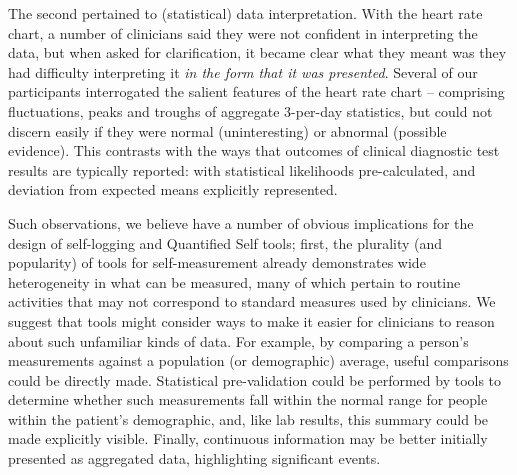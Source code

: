 \documentclass{sigchi}
\begin{document}
The second pertained to (statistical) data interpretation. With the heart rate chart, a number of clinicians said they were not confident in interpreting the data, but when asked for clarification, it became clear what they meant was they had difficulty interpreting it \emph{in the form that it was presented}.  Several of our participants interrogated the salient features of the heart rate chart -- comprising fluctuations, peaks and troughs of aggregate 3-per-day statistics, but could not discern easily if they were normal (uninteresting) or abnormal (possible evidence). This contrasts with the ways that outcomes of clinical diagnostic test results are  typically reported: with statistical likelihoods pre-calculated, and deviation from expected means explicitly represented.

Such observations, we believe have a number of obvious implications for the design of self-logging and Quantified Self tools; first, the plurality (and popularity) of tools for self-measurement already demonstrates wide heterogeneity in what can be measured, many of which pertain to routine activities that may not correspond to standard measures used by clinicians. We suggest that tools might consider ways to make it easier for clinicians to reason about such unfamiliar kinds of data.  For example, by comparing a person's measurements against a population (or demographic) average, useful comparisons could be directly made.  Statistical pre-validation could be performed by tools to determine whether such measurements fall within the normal range for people within the patient's demographic, and, like lab results, this summary could be made explicitly visible. Finally, continuous information may be better initially presented as aggregated data, highlighting significant events. 
\end{document}
